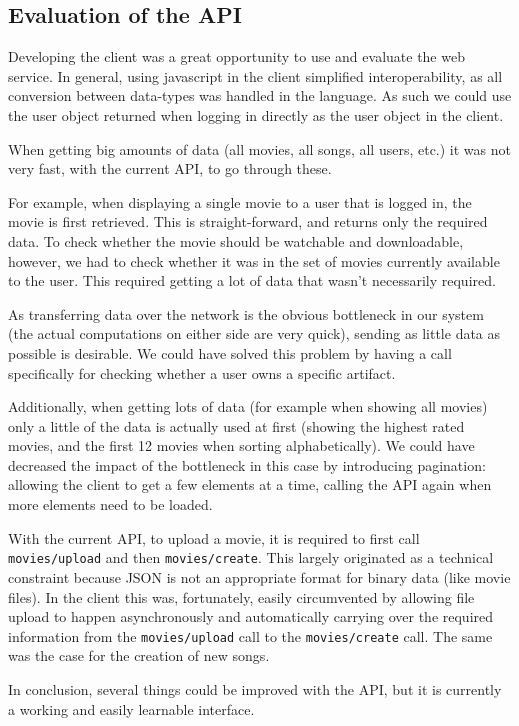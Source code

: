 \subsection{Evaluation of the API}
\label{sec:evalapi}

Developing the client was a great opportunity to use and evaluate the web
service. In general, using javascript in the client simplified
interoperability, as all conversion between data-types was handled in the
language. As such we could use the user object returned when logging in
directly as the user object in the client.

When getting big amounts of data (all movies, all songs, all users, etc.) it
was not very fast, with the current API, to go through these.

For example, when displaying a single movie to a user that
is logged in, the movie is first retrieved. This is straight-forward, and returns only the required
data. To check whether the movie should be watchable and downloadable, however, we had to check whether
it was in the set of movies currently available to the user. This required getting a lot of data that
wasn't necessarily required.

As transferring data over the network is the obvious bottleneck in our system (the actual computations
on either side are very quick), sending as little data as possible is desirable. We could have solved this
problem by having a call specifically for checking whether a user owns a specific artifact.

Additionally, when getting lots of data (for example when showing all movies) only a little of the data
is actually used at first (showing the highest rated movies, and the first 12 movies when sorting
alphabetically). We could have decreased the impact of the bottleneck in this case by introducing
pagination: allowing the client to get a few elements at a time, calling the API again when more elements
need to be loaded.

With the current API, to upload a movie, it is required to first call \verb+movies/upload+ and then
\verb+movies/create+. This largely originated as a technical constraint because JSON is not an appropriate
format for binary data (like movie files). In the client this was, fortunately, easily circumvented by
allowing file upload to happen asynchronously and automatically carrying over the required information
from the \verb+movies/upload+ call to the \verb+movies/create+ call. The same was the case for the creation
of new songs.

In conclusion, several things could be improved with the API, but it is
currently a working and easily learnable interface.
